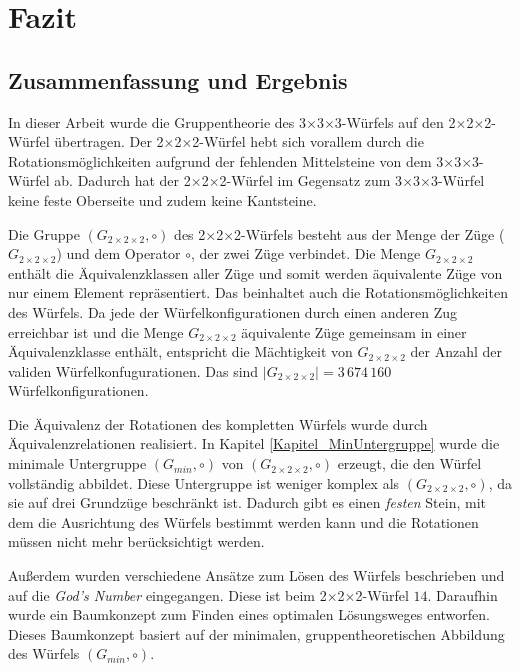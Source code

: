 \documentclass[12pt,a4paper, usenames, dvipsnames]{article}
\theoremstyle{mystyle}
\theoremstyle{definition}
\newcommand{\Gtwo}{\ensuremath{G_{2\times 2\times 2}}}
\newcommand{\Ttwo}{2$\times$2$\times$2-}
\newcommand{\Tthree}{3$\times$3$\times$3-}
\begin{document}
%
%
%
%
%
%
%
%
%
%
%
%
%
%
%
%
%
%

\newpage
\section{Fazit}

\label{Kapitel_Fazit}


%
%
%
%
%
%
%
%
%
%
%
%
%
%
%
%
%
%
%
%
\subsection{Zusammenfassung und Ergebnis}

In dieser Arbeit wurde die Gruppentheorie des \Tthree Würfels auf den \Ttwo Würfel übertragen. Der \Ttwo Würfel hebt sich vorallem durch die Rotationsmöglichkeiten aufgrund der fehlenden Mittelsteine von dem \Tthree Würfel ab. Dadurch hat der \Ttwo Würfel im Gegensatz zum \Tthree Würfel keine feste Oberseite und zudem keine Kantsteine.

Die Gruppe $(\Gtwo, \circ)$ des \Ttwo Würfels besteht aus der Menge der Züge ($\Gtwo$) und dem Operator $\circ$, der zwei Züge verbindet. Die Menge $\Gtwo$ enthält die Äquivalenzklassen aller Züge und somit werden äquivalente Züge von nur einem Element repräsentiert. Das beinhaltet auch die Rotationsmöglichkeiten des Würfels.
Da jede der Würfelkonfigurationen durch einen anderen Zug erreichbar ist und die Menge $\Gtwo$ äquivalente Züge gemeinsam in einer Äquivalenzklasse enthält, entspricht die Mächtigkeit von $\Gtwo$ der Anzahl der validen Würfelkonfugurationen. Das sind $|\Gtwo| = 3 \, 674 \, 160$ Würfelkonfigurationen. 

Die Äquivalenz der Rotationen des kompletten Würfels wurde durch Äquivalenzrelationen realisiert. In Kapitel \ref{Kapitel_MinUntergruppe} wurde die minimale Untergruppe $(G_{min}, \circ)$ von  $(\Gtwo, \circ)$ erzeugt, die den Würfel vollständig abbildet. Diese Untergruppe ist weniger komplex als $(\Gtwo, \circ)$, da sie auf drei Grundzüge beschränkt ist. Dadurch gibt es einen \textit{festen} Stein, mit dem die Ausrichtung des Würfels bestimmt werden kann und die Rotationen müssen nicht mehr berücksichtigt werden.

Außerdem wurden verschiedene Ansätze zum Lösen des Würfels beschrieben und auf die \textit{God's Number} eingegangen. Diese ist beim \Ttwo Würfel $14$. Daraufhin wurde ein Baumkonzept zum Finden eines optimalen Lösungsweges entworfen. Dieses Baumkonzept basiert auf der minimalen, gruppentheoretischen Abbildung des Würfels $(G_{min}, \circ)$.
\end{document}
